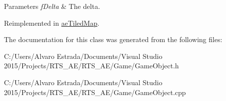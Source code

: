 \begin{DoxyParams}{Parameters}
{\em f\+Delta} & The delta. \\
\hline
\end{DoxyParams}


Reimplemented in \hyperlink{classae_tiled_map_a96e6f64deda9d9d02fef3cd173e900a8}{ae\+Tiled\+Map}.



The documentation for this class was generated from the following files\+:\begin{DoxyCompactItemize}
\item 
C\+:/\+Users/\+Alvaro Estrada/\+Documents/\+Visual Studio 2015/\+Projects/\+R\+T\+S\+\_\+\+A\+E/\+R\+T\+S\+\_\+\+A\+E/\+Game/Game\+Object.\+h\item 
C\+:/\+Users/\+Alvaro Estrada/\+Documents/\+Visual Studio 2015/\+Projects/\+R\+T\+S\+\_\+\+A\+E/\+R\+T\+S\+\_\+\+A\+E/\+Game/Game\+Object.\+cpp\end{DoxyCompactItemize}
